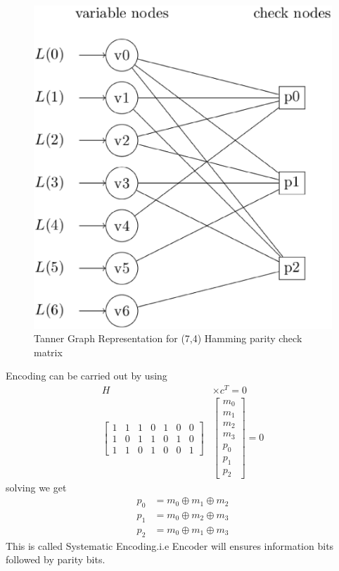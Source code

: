 \documentclass[journal,12pt,twocolumn]{IEEEtran}
\begin{document}
\begin{figure}[!ht]
\begin{center}
\includegraphics[width=\columnwidth]{./figs/tanner}
\caption{Tanner Graph Representation for (7,4) Hamming parity check matrix}
\label{fig:tanner}
\end{center}
\end{figure}
Encoding can be carried out by using 
\begin{align}
H &\times c^T =0 \\
 \begin{bmatrix} 
1 & 1 & 1 & 0 & 1 & 0 & 0 \\
1 & 0 & 1 & 1 & 0 & 1 & 0 \\
1 & 1 & 0 & 1 & 0 & 0 & 1 
\end{bmatrix} &  \begin{bmatrix} 
m_0\\
m_1\\
m_2\\
m_3 \\
p_0 \\
p_1\\
p_2
\end{bmatrix} = 0
\end{align}
solving we get
\begin{align}
p_0 &= m_0 \oplus m_1 \oplus m_2 \\
p_1 &= m_0 \oplus m_2 \oplus m_3 \\
p_2 &= m_0 \oplus m_1 \oplus m_3 
\end{align}
This is called Systematic Encoding.i.e Encoder will ensures information bits followed by parity bits.
\end{document}
